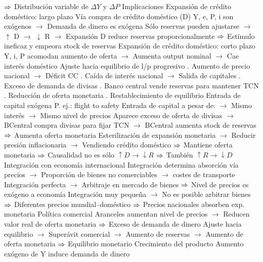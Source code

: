 \documentclass{nuevotema}
\begin{document}
\begin{esquemal}
				\4[] $\Rightarrow$ Distribución variable de $\Delta Y$ y $\Delta P$
			\3 Implicaciones
				\4 Expansión de crédito doméstico: largo plazo
				\4[] Vía compra de crédito doméstico (D)
				\4[] Y, e, P, i son exógenos
				\4[] $\to$ Demanda de dinero es exógena
				\4[] Sólo reservas pueden ajustarse
				\4[] $\to$ $\uparrow$ D $\to$ $\downarrow$ R
				\4[] $\to$ Expansión D reduce reservas proporcionalmente
				\4[] $\Rightarrow$ Estímulo ineficaz y empeora stock de reservas
				\4 Expansión de crédito doméstico: corto plazo
				\4[] Y, i, P acomodan aumento de oferta
				\4[] $\to$ Aumenta output nominal
				\4[] $\to$ Cae interés doméstico
				\4[] Ajuste hacia equilibrio de l/p progresivo
				. Aumento de precio nacional $\to$ Déficit CC
				. Caída de interés nacional $\to$ Salida de capitales
				. Exceso de demanda de divisas
				. Banco central vende reservas para mantener TCN
				. Reducción de oferta monetaria
				. Restablecimiento de equilibrio
				\4 Entrada de capital exógena
				\4[] P. ej.: flight to safety
				\4[] Entrada de capital a pesar de:
				\4[] $\to$ Mismo interés
				\4[] $\to$ Mismo nivel de precios
				\4[] Aparece exceso de oferta de divisas
				\4[] $\to$ BCentral compra divisas para fijar TCN
				\4[] $\to$ BCentral aumenta stock de reservas
				\4[] $\Rightarrow$ Aumenta oferta monetaria
				\4[] Esterilización de expansión monetaria
				\4[] $\to$ Reducir presión inflacionaria
				\4[] $\to$ Vendiendo crédito doméstico
				\4[] $\Rightarrow$ Mantiene oferta monetaria
				\4[] $\Rightarrow$ Causalidad no es sólo $\uparrow D \to \downarrow R$
				\4[] $\Rightarrow$ También $\uparrow R \to \downarrow D$
				\4 Integración con economía internacional
				\4[] Integración determina absorción vía precios
				\4[] $\to$ Proporción de bienes no comerciables
				\4[] $\to$ costes de transporte
				\4[] Integración perfecta
				\4[] $\to$ Arbitraje en mercado de bienes
				\4[] $\Rightarrow$ Nivel de precios es exógeno a economía
				\4[] Integración muy pequeña
				\4[] $\to$ No es posible arbitrar bienes
				\4[] $\Rightarrow$ Diferentes precios mundial--doméstico
				\4[] $\Rightarrow$ Precios nacionales absorben exp. monetaria
				\4 Política comercial
				\4[] Aranceles aumentan nivel de precios
				\4[] $\to$ Reducen valor real de oferta monetaria
				\4[] $\Rightarrow$ Exceso de demanda de dinero
				\4[] Ajuste hacia equilibrio
				\4[] $\to$ Superávit comercial
				\4[] $\to$ Aumento de reservas
				\4[] $\to$ Aumento de oferta monetaria
				\4[] $\Rightarrow$ Equilibrio monetario
				\4 Crecimiento del producto
				\4[] Aumento exógeno de Y induce demanda de dinero

\end{esquemal}
\end{document}
